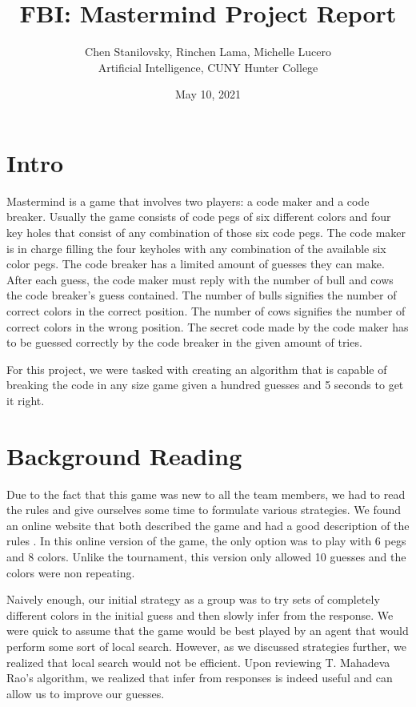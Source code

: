 \documentclass[11pt]{article}
\title{\vspace{-3cm}FBI: Mastermind Project Report}
\author{Chen Stanilovsky, Rinchen Lama, Michelle Lucero\\Artificial Intelligence, CUNY Hunter College}
\date{May 10, 2021}
\begin{document}

\maketitle
    \section{Intro}
    
    Mastermind is a game that involves two players: a code maker and a code breaker. Usually the game consists of code pegs of six different colors and four key holes that consist of any combination of those six code pegs. The code maker is in charge filling the four keyholes with any combination of the available six color pegs. The code breaker has a limited amount of guesses they can make. After each guess, the code maker must reply with the number of bull and cows the code breaker’s guess contained. The number of bulls signifies the number of correct colors in the correct position. The number of cows signifies the number of correct colors in the wrong position. The secret code made by the code maker has to be guessed correctly by the code breaker in the given amount of tries.
    
    For this project, we were tasked with creating an algorithm that is capable of breaking the code in any size game given a hundred guesses and 5 seconds to get it right.
    
    \section{Background Reading}

    Due to the fact that this game was new to all the team members, we had to read the rules and give ourselves some time to formulate various strategies. We found an online website that both described the game and had a good description of the rules \autocite{rules}. In this online version of the game, the only option was to play with 6 pegs and 8 colors. Unlike the tournament, this version only allowed 10 guesses and the colors were non repeating. 
    
    Naively enough, our initial strategy as a group was to try sets of completely different colors in the initial guess and then slowly infer from the response. We were quick to assume that the game would be best played by an agent that would perform some sort of local search. However, as we discussed strategies further, we realized that local search would not be efficient. Upon reviewing T. Mahadeva Rao's algorithm\autocite{rao}, we realized that infer from responses is indeed useful and can allow us to improve our guesses.
\end{document}
